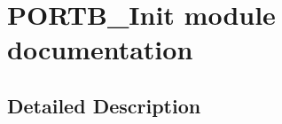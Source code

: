 \hypertarget{group___p_o_r_t_b___init__module}{}\section{P\+O\+R\+T\+B\+\_\+\+Init module documentation}
\label{group___p_o_r_t_b___init__module}


\subsection{Detailed Description}
